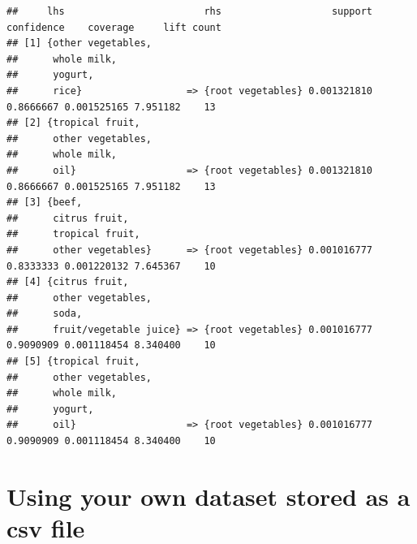 \documentclass[
]{book}
\begin{document}
\begin{verbatim}
##     lhs                        rhs                   support confidence    coverage     lift count
## [1] {other vegetables,                                                                            
##      whole milk,                                                                                  
##      yogurt,                                                                                      
##      rice}                  => {root vegetables} 0.001321810  0.8666667 0.001525165 7.951182    13
## [2] {tropical fruit,                                                                              
##      other vegetables,                                                                            
##      whole milk,                                                                                  
##      oil}                   => {root vegetables} 0.001321810  0.8666667 0.001525165 7.951182    13
## [3] {beef,                                                                                        
##      citrus fruit,                                                                                
##      tropical fruit,                                                                              
##      other vegetables}      => {root vegetables} 0.001016777  0.8333333 0.001220132 7.645367    10
## [4] {citrus fruit,                                                                                
##      other vegetables,                                                                            
##      soda,                                                                                        
##      fruit/vegetable juice} => {root vegetables} 0.001016777  0.9090909 0.001118454 8.340400    10
## [5] {tropical fruit,                                                                              
##      other vegetables,                                                                            
##      whole milk,                                                                                  
##      yogurt,                                                                                      
##      oil}                   => {root vegetables} 0.001016777  0.9090909 0.001118454 8.340400    10
\end{verbatim}

\hypertarget{using-your-own-dataset-stored-as-a-csv-file}{%
\section{Using your own dataset stored as a csv file}\label{using-your-own-dataset-stored-as-a-csv-file}}
\end{document}
